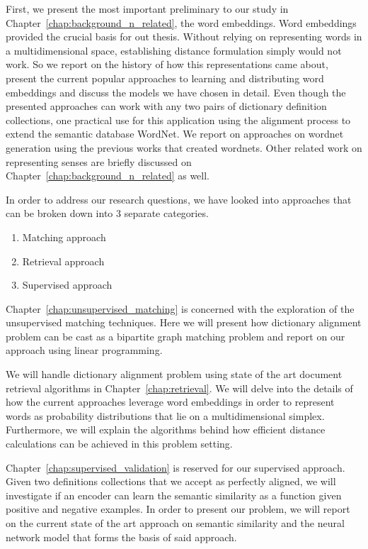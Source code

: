 First, we present the most important preliminary to our study in Chapter~\ref{chap:background_n_related}, the word embeddings.
Word embeddings provided the crucial basis for out thesis.
Without relying on representing words in a multidimensional space, establishing distance formulation simply would not work.
So we report on the history of how this representations came about, present the current popular approaches to learning and distributing word embeddings and discuss the models we have chosen in detail.
Even though the presented approaches can work with any two pairs of dictionary definition collections, one practical use for this application using the alignment process to extend the semantic database WordNet.
We report on approaches on wordnet generation using the previous works that created wordnets.
Other related work on representing senses are briefly discussed on Chapter~\ref{chap:background_n_related} as well.

In order to address our research questions, we have looked into approaches that can be broken down into 3 separate categories.
\begin{enumerate}
    \item Matching approach
    \item Retrieval approach
    \item Supervised approach
\end{enumerate}

Chapter~\ref{chap:unsupervised_matching} is concerned with the exploration of the unsupervised matching techniques.
Here we will present how dictionary alignment problem can be cast as a bipartite graph matching problem and report on our approach using linear programming.

We will handle dictionary alignment problem using state of the art document retrieval algorithms in Chapter~\ref{chap:retrieval}.
We will delve into the details of how the current approaches leverage word embeddings in order to represent words as probability distributions that lie on a multidimensional simplex.
Furthermore, we will explain the algorithms behind how efficient distance calculations can be achieved in this problem setting.

Chapter~\ref{chap:supervised_validation} is reserved for our supervised approach.
Given two definitions collections that we accept as perfectly aligned, we will investigate if an encoder can learn the semantic similarity as a function given positive and negative examples.
In order to present our problem, we will report on the current state of the art approach on semantic similarity and the neural network model that forms the basis of said approach.

